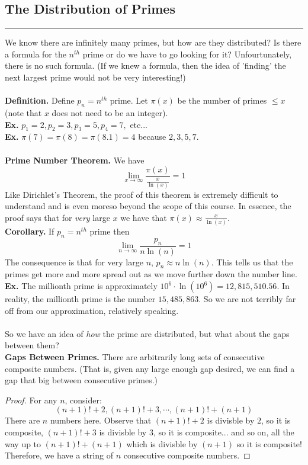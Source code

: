 \documentclass[class=article, crop=false]{standalone}
\begin{document}
\subsection{The Distribution of Primes}
\rule{\textwidth}{1pt}
We know there are infinitely many primes, but how are they distributed? Is there a formula for the $n^{th}$
prime or do we have to go looking for it? Unfourtunately, there is no such formula. (If we knew a formula,
then the idea of 'finding' the next largest prime would not be very interesting!)\\\\
\textbf{Definition.} Define $p_n=n^{th}$ prime. Let $\pi(x)$ be the number of primes $\leq x$ (note that
$x$ does not need to be an integer).\\
\textbf{Ex.} $p_1=2, p_2=3, p_3=5, p_4=7,$ etc...\\
\textbf{Ex.} $\pi(7)=\pi(8)=\pi(8.1)=4$ because $2,3,5,7$.\\\\
\textbf{Prime Number Theorem.} We have $$\lim_{x\rightarrow\infty}\frac{\pi(x)}{\frac{x}{\ln(x)}}=1$$
Like Dirichlet's Theorem, the proof of this theorem is extremely difficult to understand and is even moreso
beyond the scope of this course. In essence, the proof says that for \emph{very} large $x$ we have that
$\pi(x)\approx\frac{x}{\ln(x)}$.\\
\textbf{Corollary.} If $p_n= n^{th}$ prime then $$\lim_{n\rightarrow\infty}\frac{p_n}{n\ln(n)}=1$$
The consequence is that for very large $n$, $p_n\approx n\ln(n)$. This tells us that the primes get more and
more spread out as we move further down the number line.\\
\textbf{Ex.} The millionth prime is approximately $10^6\cdot \ln(10^6)=12,815,510.56$. In reality, the millionth
prime is the number $15,485,863$. So we are not terribly far off from our approximation, relatively speaking.\\\\
\noindent So we have an idea of \emph{how} the prime are distributed, but what about the gaps between them?\\
\textbf{Gaps Between Primes.} There are arbitrarily long sets of consecutive composite numbers. (That is, given any
large enough gap desired, we can find a gap that big between consecutive primes.)
\begin{proof}
	For any $n$, consider: $$(n+1)!+2, (n+1)!+3, \cdots, (n+1)!+(n+1)$$
	There are $n$ numbers here. Observe that $(n+1)!+2$ is divisble by $2$, so it is composite,
	$(n+1)!+3$ is divisble by $3$, so it is composite... and so on, all the way up to $(n+1)! + (n+1)$
	which is divisble by $(n+1)$ so it is composite! Therefore, we have a string of $n$ consecutive composite numbers.
\end{proof}
\end{document}

